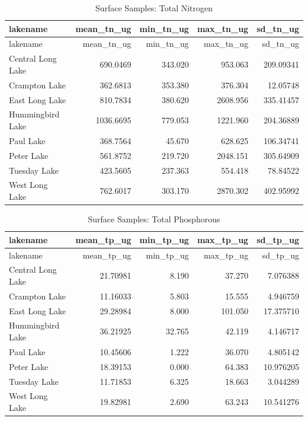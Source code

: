\documentclass[
]{article}
\begin{document}
\begin{longtable}[]{@{}lrrrr@{}}
\caption{Surface Samples: Total Nitrogen}\tabularnewline
\toprule()
lakename & mean\_tn\_ug & min\_tn\_ug & max\_tn\_ug & sd\_tn\_ug \\
\midrule()
\endfirsthead
\toprule()
lakename & mean\_tn\_ug & min\_tn\_ug & max\_tn\_ug & sd\_tn\_ug \\
\midrule()
\endhead
Central Long Lake & 690.0469 & 343.020 & 953.063 & 209.09341 \\
Crampton Lake & 362.6813 & 353.380 & 376.304 & 12.05748 \\
East Long Lake & 810.7834 & 380.620 & 2608.956 & 335.41457 \\
Hummingbird Lake & 1036.6695 & 779.053 & 1221.960 & 204.36889 \\
Paul Lake & 368.7564 & 45.670 & 628.625 & 106.34741 \\
Peter Lake & 561.8752 & 219.720 & 2048.151 & 305.64909 \\
Tuesday Lake & 423.5605 & 237.363 & 554.418 & 78.84522 \\
West Long Lake & 762.6017 & 303.170 & 2870.302 & 402.95992 \\
\bottomrule()
\end{longtable}

\begin{longtable}[]{@{}lrrrr@{}}
\caption{Surface Samples: Total Phosphorous}\tabularnewline
\toprule()
lakename & mean\_tp\_ug & min\_tp\_ug & max\_tp\_ug & sd\_tp\_ug \\
\midrule()
\endfirsthead
\toprule()
lakename & mean\_tp\_ug & min\_tp\_ug & max\_tp\_ug & sd\_tp\_ug \\
\midrule()
\endhead
Central Long Lake & 21.70981 & 8.190 & 37.270 & 7.076388 \\
Crampton Lake & 11.16033 & 5.803 & 15.555 & 4.946759 \\
East Long Lake & 29.28984 & 8.000 & 101.050 & 17.375710 \\
Hummingbird Lake & 36.21925 & 32.765 & 42.119 & 4.146717 \\
Paul Lake & 10.45606 & 1.222 & 36.070 & 4.805142 \\
Peter Lake & 18.39153 & 0.000 & 64.383 & 10.976205 \\
Tuesday Lake & 11.71853 & 6.325 & 18.663 & 3.044289 \\
West Long Lake & 19.82981 & 2.690 & 63.243 & 10.541276 \\
\bottomrule()
\end{longtable}
\end{document}
